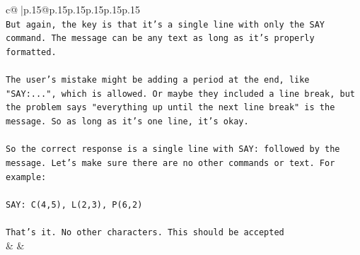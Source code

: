 \documentclass{article}
\begin{document}
{\begin{supertabular}{c@{$\;$}|p{.15\linewidth}@{}p{.15\linewidth}p{.15\linewidth}p{.15\linewidth}p{.15\linewidth}p{.15\linewidth}}
{{{\\ 
\texttt{But again, the key is that it's a single line with only the SAY command. The message can be any text as long as it's properly formatted.} \\
\\ 
\texttt{The user's mistake might be adding a period at the end, like "SAY:...", which is allowed. Or maybe they included a line break, but the problem says "everything up until the next line break" is the message. So as long as it's one line, it's okay.} \\
\\ 
\texttt{So the correct response is a single line with SAY: followed by the message. Let's make sure there are no other commands or text. For example:} \\
\\ 
\texttt{SAY: C(4,5), L(2,3), P(6,2)} \\
\\ 
\texttt{That's it. No other characters. This should be accepted} \\
            }
        }
    }
    & & \\ \\


\end{supertabular}}
\end{document}
